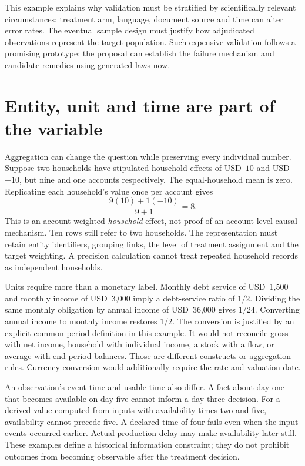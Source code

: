 This example explains why validation must be stratified by scientifically
relevant circumstances: treatment arm, language, document source and time
can alter error rates. The eventual sample design must justify how
adjudicated observations represent the target population. Such expensive
validation follows a promising prototype; the proposal can establish the
failure mechanism and candidate remedies using generated laws now.

\section{Entity, unit and time are part of the variable}

Aggregation can change the question while preserving every individual number.
Suppose two households have stipulated household effects of USD~\(10\) and
USD~\(-10\), but nine and one accounts respectively. The equal-household mean
is zero. Replicating each household's value once per account gives
\[
 \frac{9(10)+1(-10)}{9+1}=8.
\]
This is an account-weighted \emph{household} effect, not proof of an
account-level causal mechanism. Ten rows still refer to two households.
The representation must retain entity identifiers, grouping links,
the level of treatment assignment and the target weighting. A precision
calculation cannot treat repeated household records as independent households.
\citep{exec17_ontology_oracle}

Units require more than a monetary label. Monthly debt service of
USD~1,500 and monthly income of USD~3,000 imply a debt-service ratio of \(1/2\).
Dividing the same monthly obligation by annual income of USD~36,000 gives
\(1/24\). Converting annual income to monthly income restores \(1/2\).
The conversion is justified by an explicit common-period definition in this
example. It would not reconcile gross with net income, household with
individual income, a stock with a flow, or average with end-period balances.
Those are different constructs or aggregation rules. Currency conversion
would additionally require the rate and valuation date.

An observation's event time and usable time also differ. A fact about day
one that becomes available on day five cannot inform a day-three decision.
For a derived value computed from inputs with availability times two and
five, availability cannot precede five. A declared time of four fails even
when the input events occurred earlier. Actual production delay may make
availability later still. These examples define a historical information
constraint; they do not prohibit outcomes from becoming observable after
the treatment decision.\citep{exec17_ontology_oracle}

